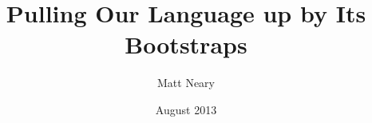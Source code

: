 \documentclass[11pt]{article}
\begin{document}
\begin{titlepage}
\title{Pulling Our Language up by Its Bootstraps}
\author{Matt Neary}
\date{August 2013}
\maketitle
\thispagestyle{empty}
\end{titlepage}
\end{document}
